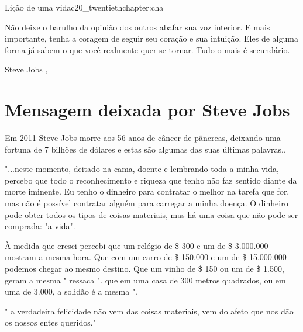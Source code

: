 \begin{chapterpage}{Lição de uma vida}{c20_twentiethchapter:cha}

\begin{myquotation}Não deixe o barulho da opinião dos outros abafar sua voz interior. E mais importante, tenha a coragem de seguir seu coração e sua intuição. Eles de alguma forma já sabem o que você realmente quer se tornar. Tudo o mais é secundário.


 
\par\vspace*{15mm}
\mbox{}\hfill \emdash{}Steve Jobs 
, %
\par\end{myquotation}

\end{chapterpage}



\section{Mensagem deixada por Steve Jobs}\label{c1_basicformatting:sec}

\emdash{}Em 2011 Steve Jobs morre aos 56 anos de câncer de pâncreas, deixando uma fortuna de 7 bilhões de dólares e estas são algumas das suas últimas palavras..

"...neste momento, deitado na cama, doente e lembrando toda a minha vida, percebo que todo o reconhecimento e riqueza que tenho não faz sentido diante da morte iminente. Eu tenho o dinheiro para contratar o melhor na tarefa que for, mas não é possível contratar alguém para carregar a minha doença. O dinheiro pode obter todos os tipos de coisas materiais, mas há uma coisa que não pode ser comprada: "a vida".

À medida que cresci percebi que um relógio de \$ 300 e um de \$ 3.000.000 mostram a mesma hora. Que com um carro de \$ 150.000 e um de \$ 15.000.000 podemos chegar ao mesmo destino. Que um vinho de \$ 150 ou um de \$ 1.500, geram a mesma " ressaca ". que em uma casa de 300 metros quadrados, ou em uma de 3.000, a solidão é a mesma ".

" a verdadeira felicidade não vem das coisas materiais, vem do afeto que nos dão os nossos entes queridos."


